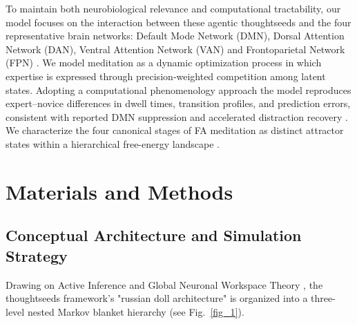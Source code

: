 \documentclass[openacc]{rsproca_new}%
\begin{document}
To maintain both neurobiological relevance and computational tractability, our model focuses on the interaction between these agentic thoughtseeds and the four representative brain networks: Default Mode Network (DMN), Dorsal Attention Network (DAN), Ventral Attention Network (VAN) and Frontoparietal Network (FPN) \cite{Yeo2011}. We model meditation as a dynamic optimization process in which expertise is expressed through precision‑weighted competition among latent states. Adopting a computational phenomenology approach \cite{SandvedSmith2025,Ramstead2022,Varela2017} the model reproduces expert–novice differences in dwell times, transition profiles, and prediction errors, consistent with reported DMN suppression and accelerated distraction recovery \cite{Fox2015,Brewer2011,Dahl2015}. We characterize the four canonical stages of FA meditation \cite{Hasenkamp2012} as distinct attractor states within a hierarchical free-energy landscape \cite{Friston2014}.

\section{Materials and Methods}
\subsection{Conceptual Architecture and Simulation Strategy}
Drawing on Active Inference \cite{Friston2017} and Global Neuronal Workspace Theory \cite{Mashour2020,DehaeneChangeux2011}, the thoughtseeds framework's "russian doll architecture" is organized into a three-level nested Markov blanket hierarchy (see Fig.~\ref{fig_1}).
\end{document}

